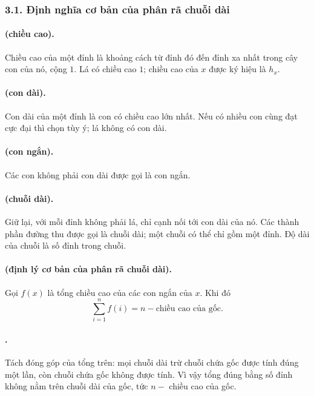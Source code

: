 \documentclass[11pt]{article}
\begin{document}
\subsubsection*{3.1. Định nghĩa cơ bản của phân rã chuỗi dài}

\paragraph{ (chiều cao).}
Chiều cao của một đỉnh là khoảng cách từ đỉnh đó đến đỉnh xa nhất trong cây con
của nó, cộng \(1\). Lá có chiều cao \(1\); chiều cao của \(x\) được ký hiệu là
\(h_x\).

\paragraph{ (con dài).}
Con dài của một đỉnh là con có chiều cao lớn nhất. Nếu có nhiều con cùng đạt
cực đại thì chọn tùy ý; lá không có con dài.

\paragraph{ (con ngắn).}
Các con không phải con dài được gọi là con ngắn.

\paragraph{ (chuỗi dài).}
Giữ lại, với mỗi đỉnh không phải lá, chỉ cạnh nối tới con dài của nó. Các thành
phần đường thu được gọi là chuỗi dài; một chuỗi có thể chỉ gồm một đỉnh. Độ dài
của chuỗi là số đỉnh trong chuỗi.

\paragraph{ (định lý cơ bản của phân rã chuỗi dài).}
Gọi \(f(x)\) là tổng chiều cao của các con ngắn của \(x\). Khi đó
\[
  \sum_{i=1}^{n} f(i)=n-\text{chiều cao của gốc}.
\]

\paragraph{.}
Tách đóng góp của tổng trên: mọi chuỗi dài trừ chuỗi chứa gốc được tính đúng
một lần, còn chuỗi chứa gốc không được tính. Vì vậy tổng đúng bằng số đỉnh
không nằm trên chuỗi dài của gốc, tức \(n-\) chiều cao của gốc.
\end{document}
